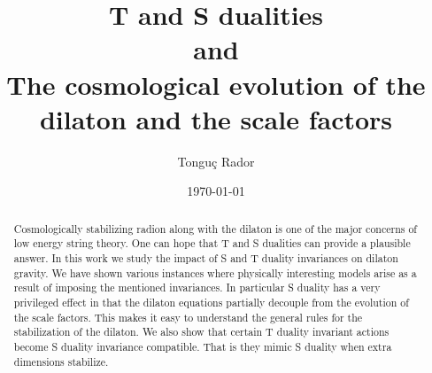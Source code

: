 \documentclass[aps,floatfix,twocolumn,amsmath]{revtex4}
\begin{document}

\title{T and S dualities \\and \\The cosmological evolution of the dilaton and the scale factors}


\author{Tongu\c{c} Rador}



\date{\today}

\begin{abstract}
Cosmologically stabilizing radion along with the dilaton is one of the major concerns of low energy string theory. One can hope that T and S dualities can provide a plausible answer. In this work we study the impact of S and T duality invariances on dilaton gravity. We have shown various instances where physically interesting models arise as a result of imposing the mentioned invariances. In particular S duality has a very privileged effect in that the dilaton equations partially decouple from the evolution of the scale factors. This makes it easy to understand the general rules for the stabilization of the dilaton. We also show that certain T duality invariant actions become S duality invariance compatible. That is they mimic S duality when extra dimensions stabilize.
\end{abstract}
\end{document}
